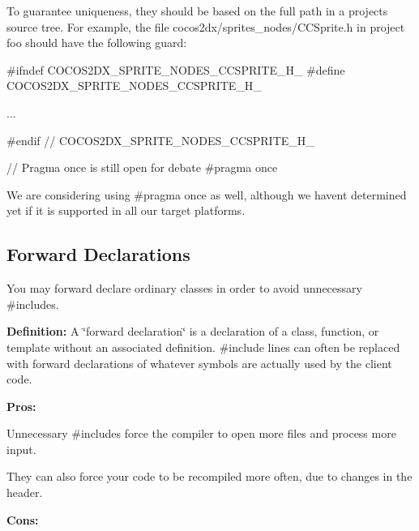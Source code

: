 To guarantee uniqueness, they should be based on the full path in a project\textquotesingle{}s source tree. For example, the file {\ttfamily cocos2dx/sprites\+\_\+nodes/\+C\+C\+Sprite.\+h} in project foo should have the following guard\+:


\begin{DoxyCode}
\textcolor{preprocessor}{#ifndef COCOS2DX\_SPRITE\_NODES\_CCSPRITE\_H\_}
\textcolor{preprocessor}{#define COCOS2DX\_SPRITE\_NODES\_CCSPRITE\_H\_}

...

#endif  \textcolor{comment}{// COCOS2DX\_SPRITE\_NODES\_CCSPRITE\_H\_}
\end{DoxyCode}



\begin{DoxyCode}
\textcolor{comment}{// Pragma once is still open for debate}
\textcolor{preprocessor}{#pragma once}
\end{DoxyCode}


We are considering using {\ttfamily \#pragma once} as well, although we haven\textquotesingle{}t determined yet if it is supported in all our target platforms.

\subsection*{Forward Declarations}

You may forward declare ordinary classes in order to avoid unnecessary {\ttfamily \#includes}.

{\bfseries Definition\+:} A \char`\"{}forward declaration\char`\"{} is a declaration of a class, function, or template without an associated definition. \#include lines can often be replaced with forward declarations of whatever symbols are actually used by the client code.

{\bfseries Pros\+:}


\begin{DoxyItemize}
\item Unnecessary \#includes force the compiler to open more files and process more input.
\item They can also force your code to be recompiled more often, due to changes in the header.
\end{DoxyItemize}

{\bfseries Cons\+:}


